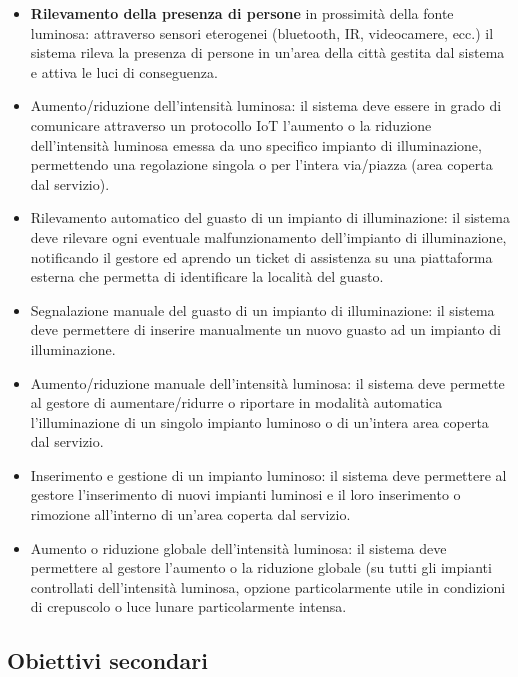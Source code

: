 \documentclass[
]{article}
\begin{document}
\begin{itemize}
\item
  \textbf{Rilevamento della presenza di persone} in prossimità della
  fonte luminosa: attraverso sensori eterogenei (bluetooth, IR,
  videocamere, ecc.) il sistema rileva la presenza di persone in un'area
  della città gestita dal sistema e attiva le luci di conseguenza.
\item
  Aumento/riduzione dell'intensità luminosa: il sistema deve essere in
  grado di comunicare attraverso un protocollo IoT l'aumento o la
  riduzione dell'intensità luminosa emessa da uno specifico impianto di
  illuminazione, permettendo una regolazione singola o per l'intera
  via/piazza (area coperta dal servizio).
\item
  Rilevamento automatico del guasto di un impianto di illuminazione: il
  sistema deve rilevare ogni eventuale malfunzionamento dell'impianto di
  illuminazione, notificando il gestore ed aprendo un ticket di
  assistenza su una piattaforma esterna che permetta di identificare la
  località del guasto.
\item
  Segnalazione manuale del guasto di un impianto di illuminazione: il
  sistema deve permettere di inserire manualmente un nuovo guasto ad un
  impianto di illuminazione.
\item
  Aumento/riduzione manuale dell'intensità luminosa: il sistema deve
  permette al gestore di aumentare/ridurre o riportare in modalità
  automatica l'illuminazione di un singolo impianto luminoso o di
  un'intera area coperta dal servizio.
\item
  Inserimento e gestione di un impianto luminoso: il sistema deve
  permettere al gestore l'inserimento di nuovi impianti luminosi e il
  loro inserimento o rimozione all'interno di un'area coperta dal
  servizio.
\item
  Aumento o riduzione globale dell'intensità luminosa: il sistema deve
  permettere al gestore l'aumento o la riduzione globale (su tutti gli
  impianti controllati dell'intensità luminosa, opzione particolarmente
  utile in condizioni di crepuscolo o luce lunare particolarmente
  intensa.
\end{itemize}

\hypertarget{obiettivi-secondari}{%
\subsection{Obiettivi secondari}\label{obiettivi-secondari}}
\end{document}
